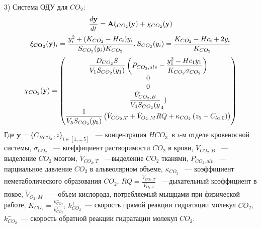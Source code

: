 3) Система ОДУ для $CO_{2}$:
\begin{equation}
\displaystyle \frac{d\textbf{y}}{dt}
=\mathbf{A}\mathbf{\xi}_{CO_{2}}(\textbf{y})+\mathbf{\chi}_{CO_{2}}(\textbf{y})\notag
\end{equation}
\begin{equation}
\mathbf{\xi_{CO_{2}}}(\textbf{y})_{i}=\frac{y_{i}^2+(K_{CO_{2}}-Hc_{i})y_{i}}{S_{CO_{2}}(y_{i})K_{CO_{2}}}, S_{CO_{2}}(y_{i})=\frac{K_{CO_{2}}-Hc_{i}+2y_{i}}{K_{CO_{2}}}\notag
\end{equation}
\begin{equation}
\mathbf{\chi}_{CO_{2}}(\mathbf{y})=\begin{pmatrix}
\displaystyle \frac{D_{CO_{2}}S}{V_{1}S_{CO_{2}}(y_{1})}\left(P_{CO_{2},alv}-\frac{y_{1}^2-Hc_{1}y_{1}}{K_{CO_{2}} \sigma_{CO_{2}}} \right) \\
0 \\
0 \\
\displaystyle \frac{\dot{V}_{CO_{2},B}}{V_{4}S_{CO_{2}}(y}_{4}) \\
\displaystyle \frac{1}{V_{5}S_{CO_{2}}(y_{5})}\left(\dot{V}_{CO_{2},T}+\dot{V}_{O_{2},M}RQ+\kappa_{CO_{2}}\left(z_{5}-C_{la,0}\right) \right)
\end{pmatrix} \notag
\end{equation}
Где $\mathbf{y} = \{ C_{HCO_{3}^{-}},i \}_{i \in [1,..,5]}$ ~--- концентрация $HCO_{3}^{-}$ в $i$-м отделе кровеносной системы, \( \sigma_{CO_{2}} \) ~--- коэффициент растворимости \( CO_{2}\) в крови, \( \dot{V}_{CO_{2},B}\) ~---выделение \( CO_{2}\) мозгом, \( \dot{V}_{CO_{2},T}\) ~---выделение \( CO_{2}\) тканями, \( P_{CO_{2},alv} \) ~--- парциальное давление \( CO_{2}\) в альвеолярном объеме, \(\kappa_{CO_{2}} \) ~--- коэффициент неметаболического образования \(CO_{2} \), $\displaystyle RQ=\frac{\dot{V}_{CO_{2},T}}{\dot{V}_{O_{2},T}}$  ~---дыхательный коэффициент в покое, $\dot{V}_{O_{2},M}$ ~--- объем кислорода, потребляемый мыщцами при физической работе, $K_{CO_{2}}=\frac{k_{CO_{2}}^{-}}{k_{CO_{2}}^{+}}$, \( k_{CO_{2}}^{+}\)~--- скорость прямой реакции гидратации молекул \( CO_{2}\), \( k_{CO_{2}}^{-}\)~--- скорость обратной реакции гидратации молекул \( CO_{2}\).

